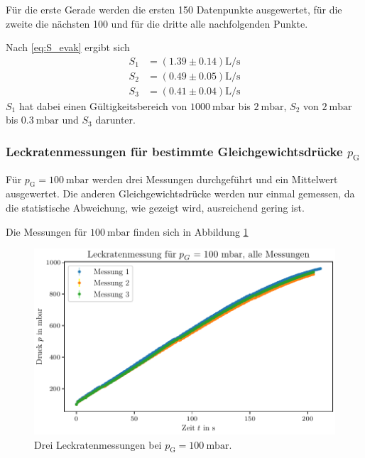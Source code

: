 Für die erste Gerade werden die ersten 150 Datenpunkte ausgewertet, für die zweite die nächsten 100 und für die dritte alle nachfolgenden Punkte.

Nach \eqref{eq:S_evak} ergibt sich
\begin{align}
    S_1 &= (\num{1.39} \pm \num{0.14}) \si{\liter\per\second} \\
    S_2 &= (\num{0.49} \pm \num{0.05}) \si{\liter\per\second} \\
    S_3 &= (\num{0.41} \pm \num{0.04}) \si{\liter\per\second} 
\end{align}
$S_1$ hat dabei einen Gültigkeitsbereich von $\SI{1000}{\milli\bar}$ bis $\SI{2}{\milli\bar}$, $S_2$ von $\SI{2}{\milli\bar}$ bis $\SI{0.3}{\milli\bar}$ und $S_3$ darunter.

\subsubsection{Leckratenmessungen für bestimmte Gleichgewichtsdrücke $p_\text{G}$}

Für $p_\text{G} = \SI{100}{\milli\bar}$ werden drei Messungen durchgeführt und ein Mittelwert ausgewertet. Die anderen Gleichgewichtsdrücke werden nur einmal gemessen, da die statistische Abweichung, wie gezeigt wird, ausreichend gering ist.

Die Messungen für $\SI{100}{\milli\bar}$ finden sich in Abbildung \ref{fig:DP_leck_100mbar_alle}

\begin{figure}[H]
    \centering
    \includegraphics[width=\textwidth]{plots/DP_Leck_100mbar_alle.pdf}
    \caption{Drei Leckratenmessungen bei $p_\text{G} = \qty{100}{\milli\bar}$.}
    \label{fig:DP_leck_100mbar_alle}
\end{figure}


